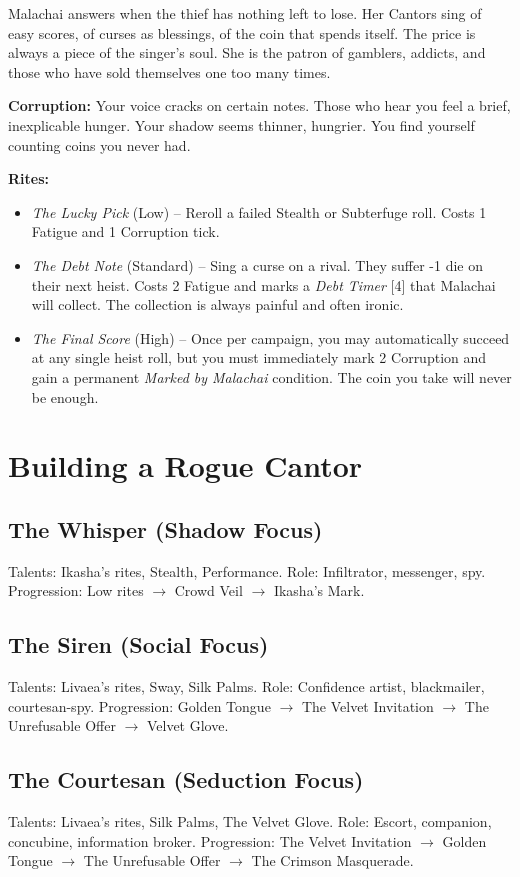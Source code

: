 \documentclass[10pt,twoside]{book}
\begin{document}
Malachai answers when the thief has nothing left to lose. Her Cantors sing of easy scores, of curses as blessings, of the coin that spends itself. The price is always a piece of the singer's soul. She is the patron of gamblers, addicts, and those who have sold themselves one too many times.

\textbf{Corruption:} Your voice cracks on certain notes. Those who hear you feel a brief, inexplicable hunger. Your shadow seems thinner, hungrier. You find yourself counting coins you never had.

\textbf{Rites:}
\begin{itemize}
\item \textit{The Lucky Pick} (Low) -- Reroll a failed Stealth or Subterfuge roll. Costs 1 Fatigue and 1 Corruption tick.
\item \textit{The Debt Note} (Standard) -- Sing a curse on a rival. They suffer -1 die on their next heist. Costs 2 Fatigue and marks a \textit{Debt Timer } [4] that Malachai will collect. The collection is always painful and often ironic.
\item \textit{The Final Score} (High) -- Once per campaign, you may automatically succeed at any single heist roll, but you must immediately mark 2 Corruption and gain a permanent \textit{Marked by Malachai} condition. The coin you take will never be enough.
\end{itemize}


\chapter{Building a Rogue Cantor}

\section{The Whisper (Shadow Focus)}
Talents: Ikasha's rites, Stealth, Performance.  
Role: Infiltrator, messenger, spy.  
Progression: Low rites $\rightarrow$ Crowd Veil $\rightarrow$ Ikasha's Mark.

\section{The Siren (Social Focus)}
Talents: Livaea's rites, Sway, Silk Palms.  
Role: Confidence artist, blackmailer, courtesan-spy.  
Progression: Golden Tongue $\rightarrow$ The Velvet Invitation $\rightarrow$ The Unrefusable Offer $\rightarrow$ Velvet Glove.

\section{The Courtesan (Seduction Focus)}
Talents: Livaea's rites, Silk Palms, The Velvet Glove.  
Role: Escort, companion, concubine, information broker.  
Progression: The Velvet Invitation $\rightarrow$ Golden Tongue $\rightarrow$ The Unrefusable Offer $\rightarrow$ The Crimson Masquerade.
\end{document}
